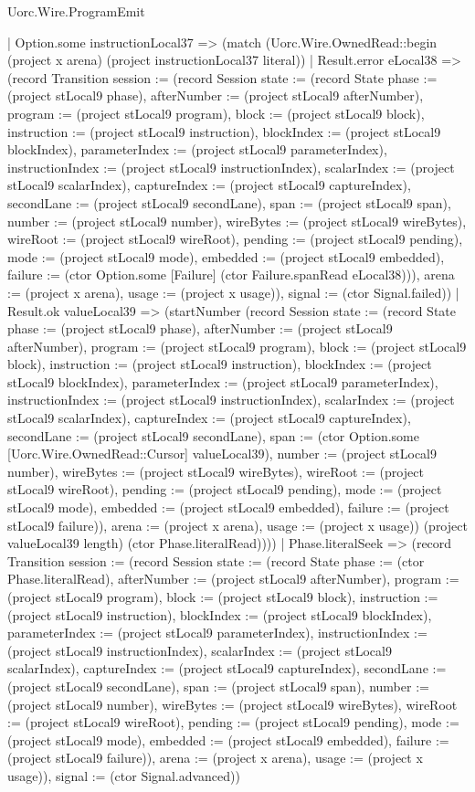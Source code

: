 \begin{lexlean}{Uorc.Wire.ProgramEmit}
\begin{semanticmodule}
{          | Option.some instructionLocal37 => (match (Uorc.Wire.OwnedRead::begin (project x arena) (project instructionLocal37 literal))
            | Result.error eLocal38 => (record Transition {session := (record Session {state := (record State {phase := (project stLocal9 phase), afterNumber := (project stLocal9 afterNumber), program := (project stLocal9 program), block := (project stLocal9 block), instruction := (project stLocal9 instruction), blockIndex := (project stLocal9 blockIndex), parameterIndex := (project stLocal9 parameterIndex), instructionIndex := (project stLocal9 instructionIndex), scalarIndex := (project stLocal9 scalarIndex), captureIndex := (project stLocal9 captureIndex), secondLane := (project stLocal9 secondLane), span := (project stLocal9 span), number := (project stLocal9 number), wireBytes := (project stLocal9 wireBytes), wireRoot := (project stLocal9 wireRoot), pending := (project stLocal9 pending), mode := (project stLocal9 mode), embedded := (project stLocal9 embedded), failure := (ctor Option.some [Failure] (ctor Failure.spanRead eLocal38))}), arena := (project x arena), usage := (project x usage)}), signal := (ctor Signal.failed)})
            | Result.ok valueLocal39 => (startNumber (record Session {state := (record State {phase := (project stLocal9 phase), afterNumber := (project stLocal9 afterNumber), program := (project stLocal9 program), block := (project stLocal9 block), instruction := (project stLocal9 instruction), blockIndex := (project stLocal9 blockIndex), parameterIndex := (project stLocal9 parameterIndex), instructionIndex := (project stLocal9 instructionIndex), scalarIndex := (project stLocal9 scalarIndex), captureIndex := (project stLocal9 captureIndex), secondLane := (project stLocal9 secondLane), span := (ctor Option.some [Uorc.Wire.OwnedRead::Cursor] valueLocal39), number := (project stLocal9 number), wireBytes := (project stLocal9 wireBytes), wireRoot := (project stLocal9 wireRoot), pending := (project stLocal9 pending), mode := (project stLocal9 mode), embedded := (project stLocal9 embedded), failure := (project stLocal9 failure)}), arena := (project x arena), usage := (project x usage)}) (project valueLocal39 length) (ctor Phase.literalRead))))
        | Phase.literalSeek => (record Transition {session := (record Session {state := (record State {phase := (ctor Phase.literalRead), afterNumber := (project stLocal9 afterNumber), program := (project stLocal9 program), block := (project stLocal9 block), instruction := (project stLocal9 instruction), blockIndex := (project stLocal9 blockIndex), parameterIndex := (project stLocal9 parameterIndex), instructionIndex := (project stLocal9 instructionIndex), scalarIndex := (project stLocal9 scalarIndex), captureIndex := (project stLocal9 captureIndex), secondLane := (project stLocal9 secondLane), span := (project stLocal9 span), number := (project stLocal9 number), wireBytes := (project stLocal9 wireBytes), wireRoot := (project stLocal9 wireRoot), pending := (project stLocal9 pending), mode := (project stLocal9 mode), embedded := (project stLocal9 embedded), failure := (project stLocal9 failure)}), arena := (project x arena), usage := (project x usage)}), signal := (ctor Signal.advanced)})
}
\end{semanticmodule}
\end{lexlean}
